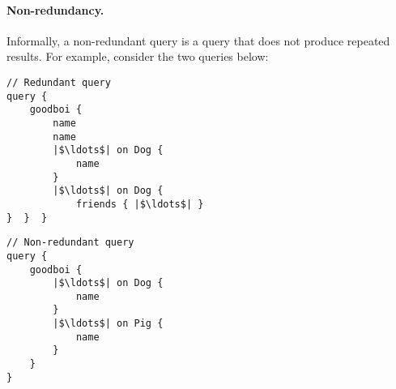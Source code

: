 \iffalse
\begin{verbatim}
Lemma are_grounded_in_ground_typed_nf (s : wfGraphQLSchema)
                                      (type_in_scope : Name)
                                      (queries : seq Query) :
        are_grounded s type_in_scope queries ->
        are_in_ground_typed_nf s queries.
\end{verbatim}
\fi





\paragraph{Non-redundancy.}

Informally, 
a non-redundant query is a query that does not produce repeated results.
For example, consider the two queries below:

\begin{minipage}[t]{.25\textwidth}
\begin{verbatim}
// Redundant query
query {
    goodboi {
        name
        name
        |$\ldots$| on Dog {
            name
        }
        |$\ldots$| on Dog {
            friends { |$\ldots$| }
}  }  }
\end{verbatim}
\end{minipage}%
\begin{minipage}[t]{.25\textwidth}
\begin{verbatim}
// Non-redundant query
query {
    goodboi {
        |$\ldots$| on Dog {
            name
        }
        |$\ldots$| on Pig {
            name
        }
    } 
}
\end{verbatim} 
\end{minipage}

